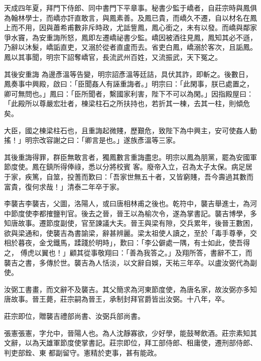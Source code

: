 \begin{pinyinscope}
 天成四年夏，拜門下侍郎、同中書門下平章事。秘書少監于嶠者，自莊宗時與鳳俱為翰林學士，而嶠亦訐直敢言，與鳳素善。及鳳已貴，而嶠久不遷，自以材名在鳳上而不用，因與蕭希甫數非斥時政，尤詆訾鳳，鳳心銜之，未有以發。而嶠與鄰家爭水竇，為安重誨所怒，鳳即左遷嶠祕書少監。嶠因被酒往見鳳，鳳知其必不遜，乃辭以沐髮，嶠詬直吏，又溺於從者直盧而去。省吏白鳳，嶠溺於客次，且詬鳳。鳳以其事聞，明宗下詔奪嶠官，長流武州百姓，又流振武，天下冤之。



 其後安重誨
 為邊彥溫等告變，明宗詔彥溫等廷詰，具伏其詐，即斬之。後數日，鳳奏事中興殿，啟曰：「臣聞姦人有誣重誨者。」明宗曰：「此閑事，朕已處置之，卿可無問也。」鳳曰：「臣所聞者，繫國家利害，陛下不可以為閑。」因指殿屋曰：「此殿所以尊嚴宏壯者，棟梁柱石之所扶持也，若折其一棟，去其一柱，則傾危矣。



 大臣，國之棟梁柱石也，且重誨起微賤，歷艱危，致陛下為中興主，安可使姦人動搖！」明宗改容謝之曰：「卿言是也。」遂族彥溫等三家。



 其後重誨得罪，群臣無敢言者，獨鳳數言重誨盡忠。明宗以鳳為朋黨，罷為安國軍節度使。鳳在鎮所得俸祿，悉以分將校賓
 客。廢帝入立，召為太子太保。病足居于家，疾篤，自筮，投蓍而歎曰：「吾家世無五十者，又皆窮賤，吾今壽過其數而富貴，復何求哉！」清泰二年卒于家。



 李襲吉李襲吉，父圖，洛陽人，或曰唐相林甫之後也。乾符中，襲吉舉進士，為河中節度使李都搉鹽判官。後去之晉，晉王以為榆次令，遂為掌書記。襲吉博學，多知唐故事。遷節度副使，官至諫議大夫。晉王與梁有隙，交兵累年，後晉王數困，欲與梁通和，使襲吉為書諭梁，辭甚辨麗。梁太祖使人讀之，至於「毒手尊拳，交相於暮夜，金戈鐵馬，蹂踐於明時」，歎曰：「李公僻處一隅，有士如此，使吾得之，
 傅虎以翼也！」顧其從事敬翔曰：「善為我答之。」及翔所答，書辭不工，而襲吉之書，多傳於世。襲吉為人恬淡，以文辭自娛，天祐三年卒。以盧汝弼代為副使。



 汝弼工書畫，而文辭不及襲吉。其父簡求為河東節度使，為唐名家，故汝弼亦多知唐故事。晉王薨，莊宗嗣為晉王，承制封拜官爵皆出汝弼。十八年，卒。



 莊宗即位，贈襲吉禮部尚書、汝弼兵部尚書。



 張憲張憲，字允中，晉陽人也。為人沈靜寡欲，少好學，能鼓琴飲酒。莊宗素知其文辭，以為天雄軍節度使掌書記。莊宗即位，拜工部侍郎、租庸使，遷刑部侍郎、判吏部銓、東
 都副留守。憲精於吏事，甚有能政。




\end{pinyinscope}
